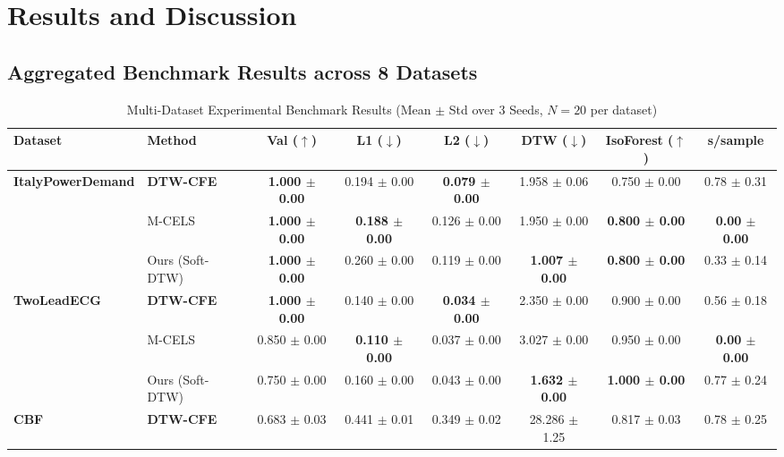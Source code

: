 \documentclass[11pt,a4paper]{report}
\begin{document}
\chapter{Results and Discussion}

\section{Aggregated Benchmark Results across 8 Datasets}

\begin{table}[h!]
    \centering
    \small
    \caption{Multi-Dataset Experimental Benchmark Results (Mean $\pm$ Std over 3 Seeds, $N=20$ per dataset)}
    \label{tab:main_results}
    \begin{tabular}{llcccccc}
        \toprule
        \textbf{Dataset} & \textbf{Method} & \textbf{Val ($\uparrow$)} & \textbf{L1 ($\downarrow$)} & \textbf{L2 ($\downarrow$)} & \textbf{DTW ($\downarrow$)} & \textbf{IsoForest ($\uparrow$)} & \textbf{s/sample} \\
        \midrule
        \multirow{3}{*}{\textbf{ItalyPowerDemand}} 
        & \textbf{DTW-CFE} & \textbf{1.000 $\pm$ 0.00} & 0.194 $\pm$ 0.00 & \textbf{0.079 $\pm$ 0.00} & 1.958 $\pm$ 0.06 & 0.750 $\pm$ 0.00 & 0.78 $\pm$ 0.31 \\
        & M-CELS & \textbf{1.000 $\pm$ 0.00} & \textbf{0.188 $\pm$ 0.00} & 0.126 $\pm$ 0.00 & 1.950 $\pm$ 0.00 & \textbf{0.800 $\pm$ 0.00} & \textbf{0.00 $\pm$ 0.00} \\
        & Ours (Soft-DTW) & \textbf{1.000 $\pm$ 0.00} & 0.260 $\pm$ 0.00 & 0.119 $\pm$ 0.00 & \textbf{1.007 $\pm$ 0.00} & \textbf{0.800 $\pm$ 0.00} & 0.33 $\pm$ 0.14 \\
        \midrule
        \multirow{3}{*}{\textbf{TwoLeadECG}} 
        & \textbf{DTW-CFE} & \textbf{1.000 $\pm$ 0.00} & 0.140 $\pm$ 0.00 & \textbf{0.034 $\pm$ 0.00} & 2.350 $\pm$ 0.00 & 0.900 $\pm$ 0.00 & 0.56 $\pm$ 0.18 \\
        & M-CELS & 0.850 $\pm$ 0.00 & \textbf{0.110 $\pm$ 0.00} & 0.037 $\pm$ 0.00 & 3.027 $\pm$ 0.00 & 0.950 $\pm$ 0.00 & \textbf{0.00 $\pm$ 0.00} \\
        & Ours (Soft-DTW) & 0.750 $\pm$ 0.00 & 0.160 $\pm$ 0.00 & 0.043 $\pm$ 0.00 & \textbf{1.632 $\pm$ 0.00} & \textbf{1.000 $\pm$ 0.00} & 0.77 $\pm$ 0.24 \\
        \midrule
        \multirow{3}{*}{\textbf{CBF}} 
        & \textbf{DTW-CFE} & 0.683 $\pm$ 0.03 & 0.441 $\pm$ 0.01 & 0.349 $\pm$ 0.02 & 28.286 $\pm$ 1.25 & 0.817 $\pm$ 0.03 & 0.78 $\pm$ 0.25 \\

\end{tabular}
\end{table}
\end{document}

